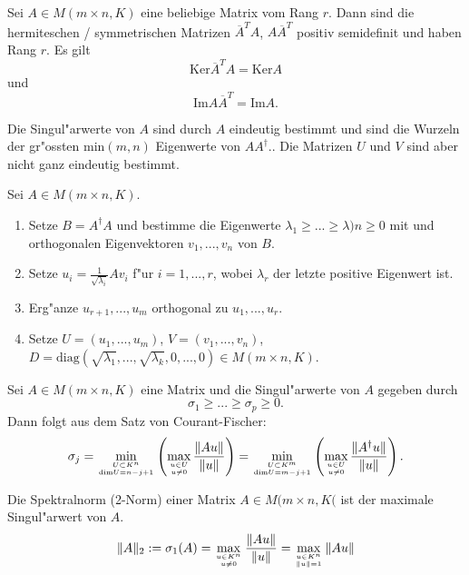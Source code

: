 \documentclass[8pt, a4paper, twocolumn, landscape]{article}
\begin{document}
\begin{lemma}
Sei $A \in M (m \times n, K)$ eine beliebige Matrix vom Rang $r$. Dann sind die hermiteschen / symmetrischen Matrizen $\overline{A}^T A$, $A\overline{A}^T$ positiv semidefinit und haben Rang $r$. Es gilt
$$
\mathrm{Ker} \overline{A}^T A = \mathrm{Ker} A
$$
und
$$
\mathrm{Im} A \overline{A}^T = \mathrm{Im} A.
$$
\end{lemma}



\begin{remark}
Die Singul"arwerte von $A$ sind durch $A$ eindeutig bestimmt und sind die Wurzeln der gr"ossten $\mathrm{min}(m, n)$ Eigenwerte von $AA^\dagger$.. Die Matrizen $U$ und $V$ sind aber nicht ganz eindeutig bestimmt.
\end{remark}

\begin{remark} 
Sei $A \in M(m \times n, K)$.
\begin{enumerate}
\item Setze $B = A^\dagger A$ und bestimme die Eigenwerte $\lambda_1 \geq ... \geq \lambda)n \geq 0$ mit und orthogonalen Eigenvektoren $v_1, ..., v_n$ von $B$.
\item Setze $u_i = \frac{1}{\sqrt{\lambda_i}} A v_i$ f"ur $i = 1, ..., r$, wobei $\lambda_r$ der letzte positive Eigenwert ist.
\item Erg"anze $u_{r+1}, ..., u_m$ orthogonal zu $u_1, ..., u_r$.
\item Setze $U = (u_1, ..., u_m)$, $V = (v_1, ..., v_n)$, $D = \mathrm{diag}(\sqrt{\lambda_1}, ..., \sqrt{\lambda_k}, 0, ..., 0) \in M(m \times n, K)$.
\end{enumerate}
\end{remark}


\begin{corollary}
Sei $A \in M(m \times n, K)$ eine Matrix und die Singul"arwerte von $A$ gegeben durch
$$
\sigma_1 \geq ... \geq \sigma_p \geq 0.
$$
Dann folgt aus dem Satz von Courant-Fischer:
$$
\sigma_j = \min\limits_{U \subset K^n \atop \mathrm{dim}U = n-j+1} \left(   \max\limits_{u \in U \atop u \neq 0} \frac{\|Au\|}{\|u\|}\right) = \min\limits_{U \subset K^m \atop \mathrm{dim} U = m - j + 1} \left(   \max\limits_{ u \in U \atop u \neq 0 } \frac{ \|A^\dagger u\| }{ \|u\| } \right).
$$
\end{corollary}


\begin{definition}
Die Spektralnorm (2-Norm) einer Matrix $A \in M(m \times n, K($ ist der maximale Singul"arwert von $A$.
$$
\|A\|_{2}:=\sigma_{1}(A)=\max _{u \in K^n \atop u \neq 0} \frac{\|A u\|}{\|u\|}=\max _{u \in K^n \atop \|u\|=1}\|A u\|
$$
\end{definition}
\end{document}
